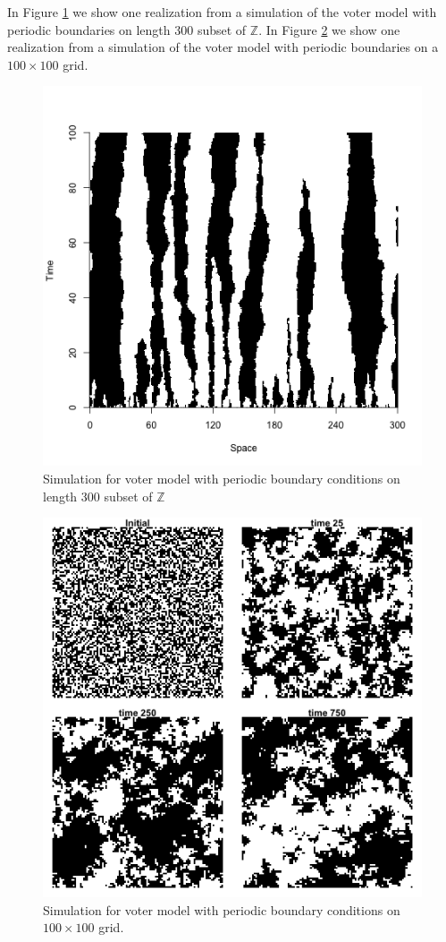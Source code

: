 \documentclass{article}
\theoremstyle{plain}
\theoremstyle{definition}
\theoremstyle{remark}
\numberwithin{equation}{section}
\newcommand{\Z}{\mathbb{Z}}
\begin{document}
In Figure \ref{fig:voter_sim_1d_torus.png} we show one realization from a simulation of the voter model with periodic boundaries on length 300 subset of $\Z$.
In Figure \ref{fig:voter_sim_torus.png} we show one realization from a simulation of the voter model with periodic boundaries on a $100 \times 100$ grid.

\begin{figure}[H]
  \centering
    \includegraphics[width=.80\textwidth]{figures/voter_simulation_1d_300.png}
   \caption{Simulation for voter model with periodic boundary conditions on length 300 subset of $\Z$}
  \label{fig:voter_sim_1d_torus.png}
\end{figure}

\begin{figure}[H]
  \centering
    \includegraphics[width=.80\textwidth]{figures/voter_simulation_torus_100.png}
   \caption{Simulation for voter model with periodic boundary conditions on $100 \times 100$ grid.}
  \label{fig:voter_sim_torus.png}
\end{figure}
\end{document}
